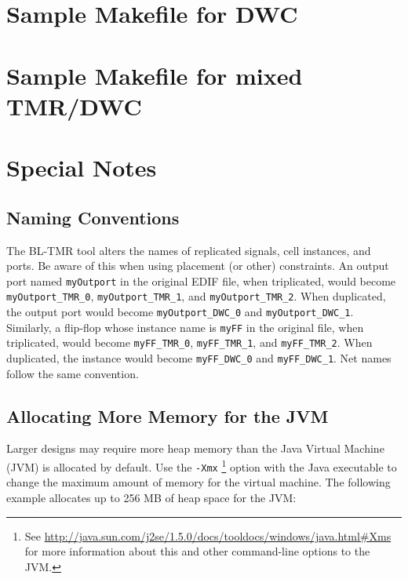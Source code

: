 \documentclass[english]{article}
\numberwithin{figure}{section}
\begin{document}
\section{Sample Makefile for DWC}
\newpage
\section{Sample Makefile for mixed TMR/DWC}



\newpage
\section{Special Notes}

\subsection{Naming Conventions}
\label{naming conventions}
The BL-TMR tool alters the names of replicated signals, cell instances, and 
ports. Be aware of this when using placement (or other) constraints. An output
port named \texttt{myOutport} in the original EDIF file, when triplicated,
would become \texttt{myOutport\_TMR\_0}, \texttt{myOutport\_TMR\_1}, and
\texttt{myOutport\_TMR\_2}. When duplicated, the output port would become
\texttt{myOutport\_DWC\_0} and \texttt{myOutport\_DWC\_1}. Similarly, a
flip-flop whose instance name is \texttt{myFF} in the original file, when
triplicated, would become \texttt{myFF\_TMR\_0}, \texttt{myFF\_TMR\_1}, and
\texttt{myFF\_TMR\_2}. When duplicated, the instance would become
\texttt{myFF\_DWC\_0} and \texttt{myFF\_DWC\_1}. Net names follow the same
convention.

\subsection{Allocating More Memory for the JVM}
Larger designs may require more heap memory than the Java Virtual Machine (JVM) 
is allocated by default. Use the \texttt{-Xmx}
\footnote{See 
\url{http://java.sun.com/j2se/1.5.0/docs/tooldocs/windows/java.html\#Xms} 
for more information about this and other command-line options to the JVM.} 
option with the Java executable to change the maximum amount of memory for 
the virtual machine. The following example allocates up to 256 MB of 
heap space for the JVM:
\end{document}
